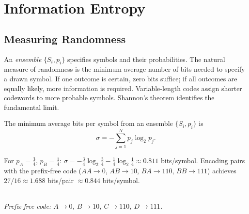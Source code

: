 \section{Information Entropy}

\subsection{Measuring Randomness}

An \emph{ensemble} $\{S_i, p_i\}$ specifies symbols and their probabilities. The natural measure of randomness is the minimum average number of bits needed to specify a drawn symbol. If one outcome is certain, zero bits suffice; if all outcomes are equally likely, more information is required. Variable-length codes assign shorter codewords to more probable symbols. Shannon's theorem identifies the fundamental limit.

\begin{theorem}
The minimum average bits per symbol from an ensemble $\{S_i, p_i\}$ is
\begin{equation}
    \sigma = -\sum_{j=1}^{N} p_j \log_2 p_j.
\end{equation}
\end{theorem}

\begin{example}
For $p_A = \tfrac{3}{4}$, $p_B = \tfrac{1}{4}$: $\sigma = -\tfrac{3}{4}\log_2\tfrac{3}{4} - \tfrac{1}{4}\log_2\tfrac{1}{4} \approx 0.811$ bits/symbol. Encoding pairs with the prefix-free code ($AA\to0$, $AB\to10$, $BA\to110$, $BB\to111$) achieves $27/16 \approx 1.688$ bits/pair $\approx 0.844$ bits/symbol.

\begin{center}
\\[3pt]
{\small\itshape Prefix-free code: $A\to0$, $B\to10$, $C\to110$, $D\to111$.}
\end{center}
\end{example}

